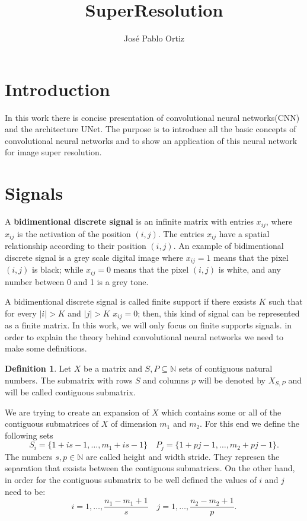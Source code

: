 \documentclass{article}
\theoremstyle{definition}
\newtheorem{definition}{Definition}
\begin{document}
\title{SuperResolution}

\author{José Pablo Ortiz}
\maketitle

\section{Introduction}
In this work there is concise presentation of convolutional neural networks(CNN) and the architecture UNet. The purpose is to introduce all the basic concepts of convolutional neural networks and to show an application of this neural network for image super resolution. 
\section{Signals}
A \textbf{bidimentional discrete signal} is an infinite matrix with entries $x_{ij}$, where $x_{ij}$ is the activation of the position $(i,j)$\cite{Calin}. The entries $x_{ij}$  have a spatial relationship according to their position $(i,j)$. An example of bidimentional discrete signal is a grey scale digital image where $x_{ij}=1$ means that the pixel $(i,j)$ is black; while $x_{ij}=0$ means that the pixel $(i,j)$ is white, and any number between 0 and 1 is a grey tone.

\noindent
A bidimentional discrete signal is called finite support if there exsists $K$ such that for every $|i|>K$ and $|j|>K$ $x_{ij}= 0$; then, this kind of signal can be represented as a finite matrix. In this work, we will only focus on finite supports signals. in order to explain the theory behind convolutional neural networks we need to make some definitions. 



\begin{definition}
Let $X$ be a matrix and  $S,P\subseteq \mathbb{N}$ sets of contiguous natural numbers. The submatrix with rows $S$ and columns $p$ will be denoted by $X_{S,P}$ and will be called contiguous submatrix.
\end{definition}
\noindent
We are trying to create an expansion of $X$ which contains some or all of the contiguous submatrices of $X$ of dimension $m_1$ and $m_2$. For this end we define the following sets
\begin{equation}
S_i=\{1+is-1,\dots,m_1+is-1\}\quad P_j = \{1+pj-1,\dots,m_2+pj-1\}.
\end{equation}
The numbers $s,p\in\mathbb{N}$  are called height and width stride. They represen the separation that exsists between the contiguous submatrices. On the other hand, in order for the contiguous submatrix to be well defined the values of $i$ and $j$ need to be:
$$i= 1,\dots,\frac{n_1-m_1+1}{s}\quad j= 1,\dots,\frac{n_2-m_2+1}{p}. $$
\end{document}
